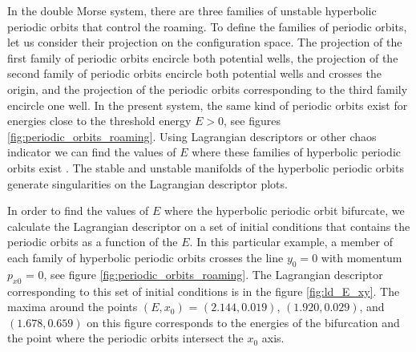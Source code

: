 \documentclass[10pt,aps,onecolumn,superscriptaddress]{revtex4-2}
\begin{document}
In the double Morse system, there are three families of unstable hyperbolic periodic orbits that control the roaming. To define the families of periodic orbits, let us consider their projection on the configuration space. The projection of the first family of periodic orbits encircle both potential wells, the projection of the second family of periodic orbits encircle both potential wells and crosses the origin, and the projection of the periodic orbits corresponding to the third family encircle one well. In the present system, the same kind of periodic orbits exist for energies close to the threshold energy $E>0$, see figures \ref{fig:periodic_orbits_roaming}. Using Lagrangian descriptors or other chaos indicator we can find the values of $E$ where these families of hyperbolic periodic orbits exist  \cite{Demian2017,Gonzalez2020}. The stable and unstable manifolds of the hyperbolic periodic orbits generate singularities on the Lagrangian descriptor plots.

In order to find the values of $E$ where the hyperbolic periodic orbit bifurcate, we calculate the Lagrangian descriptor on a set of initial conditions that contains the periodic orbits as a function of the $E$. In this particular example, a member of each family of hyperbolic periodic orbits crosses the line $y_0=0$ with momentum $p_{x0}$ = 0, see figure \ref{fig:periodic_orbits_roaming}. The Lagrangian descriptor corresponding to this set of initial conditions is in the figure \ref{fig:ld_E_xy}. The maxima around the points  $(E,x_0)$ = $(2.144,0.019)$, $(1.920,0.029)$, and $(1.678,0.659)$ on this figure corresponds to the energies of the bifurcation and the point where the periodic orbits intersect the $x_0$ axis. 
\end{document}
